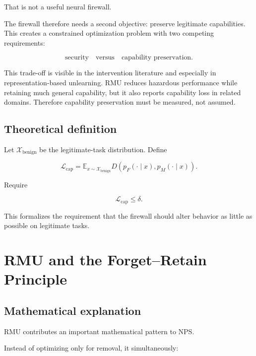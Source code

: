 \documentclass[11pt]{article}
\newcommand{\X}{\mathcal{X}}
\newcommand{\E}{\mathbb{E}}
\begin{document}
That is not a useful neural firewall.

The firewall therefore needs a second objective: preserve legitimate
capabilities. This creates a constrained optimization problem with two
competing requirements:

\begin{equation}
\text{security}
\quad\text{versus}\quad
\text{capability preservation}.
\end{equation}

This trade-off is visible in the intervention literature and especially in
representation-based unlearning. RMU reduces hazardous performance while
retaining much general capability, but it also reports capability loss in
related domains. Therefore capability preservation must be measured, not
assumed.

\subsection*{Theoretical definition}

Let $\X_{\mathrm{benign}}$ be the legitimate-task distribution. Define

\begin{equation}
\mathcal L_{\mathrm{cap}}
=
\E_{x\sim\X_{\mathrm{benign}}}
D\!\left(
p_F(\cdot\mid x),
p_M(\cdot\mid x)
\right).
\end{equation}

Require

\begin{equation}
\boxed{
\mathcal L_{\mathrm{cap}}\leq\delta.
}
\end{equation}

This formalizes the requirement that the firewall should alter behavior as
little as possible on legitimate tasks.

\section{RMU and the Forget--Retain Principle}

\subsection*{Mathematical explanation}

RMU contributes an important mathematical pattern to NPS.

Instead of optimizing only for removal, it simultaneously:
\end{document}
